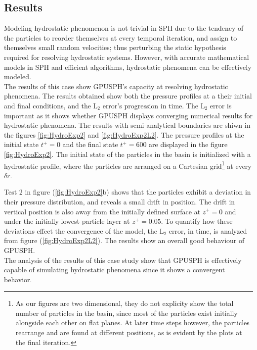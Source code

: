 \documentclass{../GPUSPHtemplate}
\begin{document}
\subsection{Results}
Modeling hydrostatic phenomenon is not trivial in SPH due to the tendency of the particles
to reorder themselves at every temporal iteration, and assign to themselves small random velocities;
thus perturbing the static hypothesis required for resolving hydrostatic systems. However, with accurate
mathematical models in SPH and efficient algorithms, hydrostatic phenomena can be effectively modeled.\\

The results of this case show GPUSPH's capacity at resolving hydrostatic phenomena. The results obtained show
both the pressure profiles at a their initial and final conditions, and the L$_2$ error's progression in time.
The L$_2$ error is important as it shows whether
GPUSPH displays converging numerical results for hydrostatic phenomena.
The results with semi-analytical boundaries are shiwn in the figures \ref{fig:HydroExp2} and \ref{fig:HydroExp2L2}.
The pressure profiles at the initial state $t^+=0$ and the final state $t^+=600$ are displayed in the figure \ref{fig:HydroExp2}.
The initial state of the particles in the basin is initialized with a hydrostatic profile, where the particles are arranged
on a Cartesian grid\footnote{As our figures are two dimensional, they do not explicity show the total
  number of particles in the basin, since most of the particles exist initially alongside each other on flat planes.
  At later time steps however, the particles rearrange and are found at different positions, as is evident
  by the plots at the final iteration.} at every $\delta r$.

Test 2 in figure (\ref{fig:HydroExp2}b) shows that the particles exhibit a deviation
in their pressure distribution, and reveals a small drift in position. The drift in vertical position
is also away from the initially defined surface at $z^+=0$ and under the initially lowest particle layer
at $z^+=0.05$. To quantify how these deviations effect the convergence of the model, the L$_2$ error, in time,
is analyzed from figure (\ref{fig:HydroExp2L2}). The results show an overall good behaviour of GPUSPH.\\

The analysis of the results of this case study show that GPUSPH is effectively capable of simulating
hydrostatic phenomena since it shows a convergent behavior. 
\vfill
\end{document}
